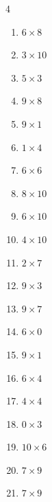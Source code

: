 \begin{multicols}{4}
\begin{enumerate}
  \item $6\times 8$
        \phantom{$=48$}

  \item $3\times 10$
        \phantom{$=30$}

  \item $5\times 3$
        \phantom{$=15$}

  \item $9\times 8$
        \phantom{$=72$}

  \item $9\times 1$
        \phantom{$=9$}

  \item $1\times 4$
        \phantom{$=4$}

  \item $6\times 6$
        \phantom{$=36$}

  \item $8\times 10$
        \phantom{$=80$}

  \item $6\times 10$
        \phantom{$=60$}

  \item $4\times 10$
        \phantom{$=40$}

  \item $2\times 7$
        \phantom{$=14$}

  \item $9\times 3$
        \phantom{$=27$}

  \item $9\times 7$
        \phantom{$=63$}

  \item $6\times 0$
        \phantom{$=0$}

  \item $9\times 1$
        \phantom{$=9$}

\columnbreak %

  \item $6\times 4$
        \phantom{$=24$}

  \item $4\times 4$
        \phantom{$=16$}

  \item $0\times 3$
        \phantom{$=0$}

  \item $10\times 6$
        \phantom{$=60$}

  \item $7\times 9$
        \phantom{$=63$}

  \item $7\times 9$
        \phantom{$=63$}


\end{enumerate}
\end{multicols}
